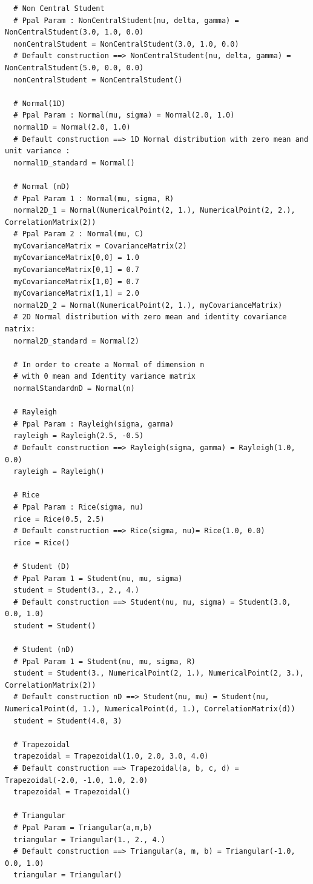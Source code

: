 \begin{lstlisting}
  # Non Central Student
  # Ppal Param : NonCentralStudent(nu, delta, gamma) = NonCentralStudent(3.0, 1.0, 0.0)
  nonCentralStudent = NonCentralStudent(3.0, 1.0, 0.0)
  # Default construction ==> NonCentralStudent(nu, delta, gamma) = NonCentralStudent(5.0, 0.0, 0.0)
  nonCentralStudent = NonCentralStudent()

  # Normal(1D)
  # Ppal Param : Normal(mu, sigma) = Normal(2.0, 1.0)
  normal1D = Normal(2.0, 1.0)
  # Default construction ==> 1D Normal distribution with zero mean and unit variance :
  normal1D_standard = Normal()

  # Normal (nD)
  # Ppal Param 1 : Normal(mu, sigma, R)
  normal2D_1 = Normal(NumericalPoint(2, 1.), NumericalPoint(2, 2.), CorrelationMatrix(2))
  # Ppal Param 2 : Normal(mu, C)
  myCovarianceMatrix = CovarianceMatrix(2)
  myCovarianceMatrix[0,0] = 1.0
  myCovarianceMatrix[0,1] = 0.7
  myCovarianceMatrix[1,0] = 0.7
  myCovarianceMatrix[1,1] = 2.0
  normal2D_2 = Normal(NumericalPoint(2, 1.), myCovarianceMatrix)
  # 2D Normal distribution with zero mean and identity covariance matrix:
  normal2D_standard = Normal(2)

  # In order to create a Normal of dimension n
  # with 0 mean and Identity variance matrix
  normalStandardnD = Normal(n)

  # Rayleigh
  # Ppal Param : Rayleigh(sigma, gamma)
  rayleigh = Rayleigh(2.5, -0.5)
  # Default construction ==> Rayleigh(sigma, gamma) = Rayleigh(1.0, 0.0)
  rayleigh = Rayleigh()

  # Rice
  # Ppal Param : Rice(sigma, nu)
  rice = Rice(0.5, 2.5)
  # Default construction ==> Rice(sigma, nu)= Rice(1.0, 0.0)
  rice = Rice()

  # Student (D)
  # Ppal Param 1 = Student(nu, mu, sigma)
  student = Student(3., 2., 4.)
  # Default construction ==> Student(nu, mu, sigma) = Student(3.0, 0.0, 1.0)
  student = Student()

  # Student (nD)
  # Ppal Param 1 = Student(nu, mu, sigma, R)
  student = Student(3., NumericalPoint(2, 1.), NumericalPoint(2, 3.), CorrelationMatrix(2))
  # Default construction nD ==> Student(nu, mu) = Student(nu, NumericalPoint(d, 1.), NumericalPoint(d, 1.), CorrelationMatrix(d))
  student = Student(4.0, 3)

  # Trapezoidal
  trapezoidal = Trapezoidal(1.0, 2.0, 3.0, 4.0)
  # Default construction ==> Trapezoidal(a, b, c, d) = Trapezoidal(-2.0, -1.0, 1.0, 2.0)
  trapezoidal = Trapezoidal()

  # Triangular
  # Ppal Param = Triangular(a,m,b)
  triangular = Triangular(1., 2., 4.)
  # Default construction ==> Triangular(a, m, b) = Triangular(-1.0, 0.0, 1.0)
  triangular = Triangular()


\end{lstlisting}
